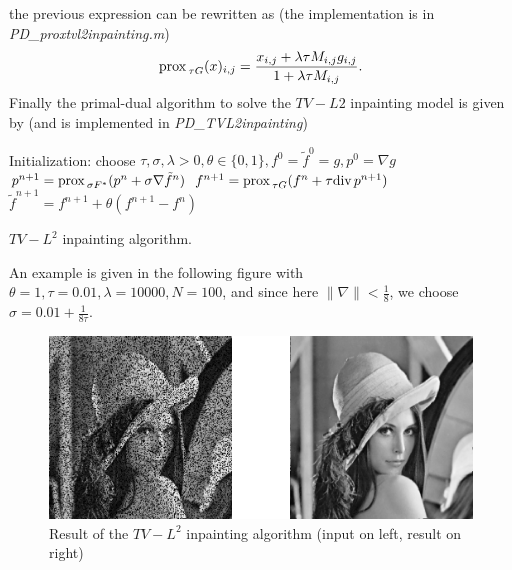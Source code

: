 \documentclass[letter,10pt]{article}
\def\Div{\textup{div\,}}
\def\prox{\textup{prox\,}}
\begin{document}
the previous expression can be rewritten as (the implementation is in \textit{PD\_proxtvl2inpainting.m})
$$\prox_{\tau G}(x)_{i,j}=\frac{x_{i,j}+\lambda\tau M_{i,j}g_{i,j}}{1+\lambda\tau M_{i,j}}.$$
Finally the primal-dual algorithm to solve the $TV-L2$ inpainting model is given by (and is implemented in \textit{PD\_TVL2inpainting})
\begin{algorithm}[H]
\begin{algorithmic}
\STATE Initialization: choose $\tau,\sigma,\lambda>0,\theta\in\{0,1\},f^0=\tilde{f}^0=g,p^0=\nabla g$
\REPEAT 
\STATE $p^{n+1}=\prox_{\sigma F^*}(p^n+\sigma \nabla\tilde{f}^n)$
\STATE $f^{n+1}=\prox_{\tau G}(f^n+\tau \Div p^{n+1})$
\STATE $\tilde{f}^{n+1}=f^{n+1}+\theta(f^{n+1}-f^n)$
\end{algorithmic}
\caption{$TV-L^2$ inpainting algorithm.}
\end{algorithm}
An example is given in the following figure with $\theta=1,\tau=0.01,\lambda=10000,N=100$, and since here $\|\nabla\|<\frac{1}{8}$, we choose $\sigma=0.01+\frac{1}{8\tau}$.
\begin{figure}[H]
\centering\includegraphics[width=\textwidth]{tvl2inpainting.png}
\caption{Result of the $TV-L^2$ inpainting algorithm (input on left, result on right)}
\end{figure}
\end{document}
